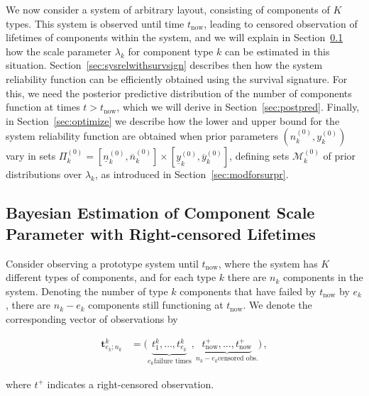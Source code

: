 \documentclass[Journal,SectionNumbers,SingleSpace,InsideFigs]{ascelike}
\renewcommand{\vec}[1]{{\bm#1}}
\newcommand{\uz}{^{(0)}} %
\newcommand{\ul}[1]{\underline{#1}}
\newcommand{\ol}[1]{\overline{#1}}
\def\ykz{y\uz_k}
\def\ykzl{\ul{y}\uz_k}
\def\ykzu{\ol{y}\uz_k}
\def\nkz{n\uz_k}
\def\nkzl{\ul{n}\uz_k}
\def\nkzu{\ol{n}\uz_k}
\def\MkZ{\mathcal{M}\uz_k}
\def\PkZ{\Pi\uz_k}
\def\tnow{t_\text{now}}
\def\tpnow{t^+_\text{now}}
\begin{document}
We now consider a system of arbitrary layout,
consisting of components of $K$ types.
This system is observed until time $\tnow$,
leading to censored observation of lifetimes of components within the system,
and we will explain in Section~\ref{sec:lambdawithcens}
how the scale parameter $\lambda_k$ for component type $k$
can be estimated in this situation.
%
Section~\ref{sec:sysrelwithsurvsign} describes then
how the system reliability function can be efficiently obtained using the survival signature.
%
For this, we need the posterior predictive distribution
of the number of components function at times $t > \tnow$,
which we will derive in Section~\ref{sec:postpred}.
%
Finally, in Section~\ref{sec:optimize} we describe how
the lower and upper bound for the system reliability function
are obtained when prior parameters $(\nkz,\ykz)$
vary in sets $\PkZ = [\nkzl,\nkzu] \times [\ykzl,\ykzu]$,
defining sets $\MkZ$ of prior distributions over $\lambda_k$,
as introduced in Section~\ref{sec:modforsurpr}.


\subsection{Bayesian Estimation of Component Scale Parameter with Right-censored Lifetimes}
\label{sec:lambdawithcens}

Consider observing a prototype system until $\tnow$,
where the system has $K$ different types of components,
and for each type $k$ there are $n_k$ components in the system.
Denoting the number of type $k$ components that have failed by $\tnow$ by $e_k$,
there are $n_k - e_k$ components still functioning at $\tnow$.
We denote the corresponding vector of observations by
\begin{linenomath*}
\begin{align}
\vec{t}^k_{e_k;n_k} &= \big( \underbrace{t^k_1, \ldots, t^k_{e_k}}_{e_k \text{failure times}},
                             \underbrace{\tpnow, \ldots, \tpnow}_{n_k-e_k \text{censored obs.}} \big)\,,
\end{align}
\end{linenomath*}
where $t^+$ indicates a right-censored observation.
%
\end{document}
